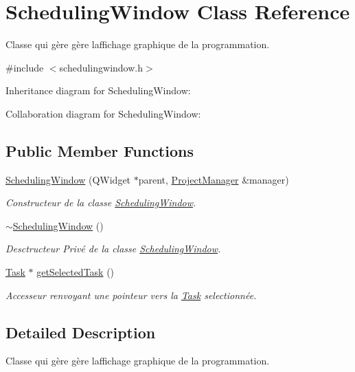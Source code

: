 \hypertarget{class_scheduling_window}{}\section{Scheduling\+Window Class Reference}
\label{class_scheduling_window}


Classe qui gère gère l\textquotesingle{}affichage graphique de la programmation.  




{\ttfamily \#include $<$schedulingwindow.\+h$>$}



Inheritance diagram for Scheduling\+Window\+:


Collaboration diagram for Scheduling\+Window\+:
\subsection*{Public Member Functions}
\begin{DoxyCompactItemize}
\item 
\hyperlink{class_scheduling_window_ac42fc6b99dee953df434b379e5b39a74}{Scheduling\+Window} (Q\+Widget $\ast$parent, \hyperlink{class_project_manager}{Project\+Manager} \&manager)
\begin{DoxyCompactList}\small\item\em Constructeur de la classe \hyperlink{class_scheduling_window}{Scheduling\+Window}. \end{DoxyCompactList}\item 
\hyperlink{class_scheduling_window_a2e5c142fd80045e156011c4dd5c46018}{$\sim$\+Scheduling\+Window} ()
\begin{DoxyCompactList}\small\item\em Desctructeur Privé de la classe \hyperlink{class_scheduling_window}{Scheduling\+Window}. \end{DoxyCompactList}\item 
\hyperlink{class_task}{Task} $\ast$ \hyperlink{class_scheduling_window_a6b7828274f864479585e379a570ea574}{get\+Selected\+Task} ()
\begin{DoxyCompactList}\small\item\em Accesseur renvoyant une pointeur vers la \hyperlink{class_task}{Task} selectionnée. \end{DoxyCompactList}\end{DoxyCompactItemize}


\subsection{Detailed Description}
Classe qui gère gère l\textquotesingle{}affichage graphique de la programmation. 

